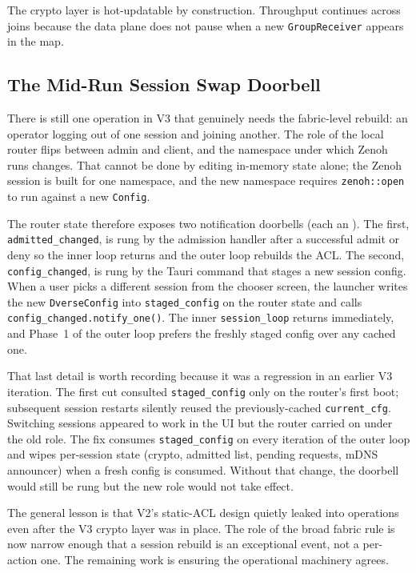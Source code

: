 \documentclass[11pt,a4paper]{article}
\begin{document}
The crypto layer is hot-updatable by construction. Throughput
continues across joins because the data plane does not pause when a
new \texttt{GroupReceiver} appears in the map.

\subsection{The Mid-Run Session Swap Doorbell}

There is still one operation in V3 that genuinely needs the
fabric-level rebuild: an operator logging out of one session and
joining another. The role of the local router flips between admin and
client, and the namespace under which Zenoh runs changes. That cannot
be done by editing in-memory state alone; the Zenoh session is built
for one namespace, and the new namespace requires
\texttt{zenoh::open} to run against a new \texttt{Config}.

The router state therefore exposes two notification doorbells
(each an ). The first,
\texttt{admitted\_changed}, is rung by the admission handler after a
successful admit or deny so the inner loop returns and the outer
loop rebuilds the ACL. The second, \texttt{config\_changed}, is rung
by the Tauri command that stages a new session config. When a user
picks a different session from the chooser screen, the launcher
writes the new \texttt{DverseConfig} into \texttt{staged\_config} on
the router state and calls \texttt{config\_changed.notify\_one()}.
The inner \texttt{session\_loop} returns immediately, and Phase~1 of
the outer loop prefers the freshly staged config over any cached one.

That last detail is worth recording because it was a regression in
an earlier V3 iteration. The first cut consulted
\texttt{staged\_config} only on the router's first boot; subsequent
session restarts silently reused the previously-cached
\texttt{current\_cfg}. Switching sessions appeared to work in the UI
but the router carried on under the old role. The fix consumes
\texttt{staged\_config} on every iteration of the outer loop and
wipes per-session state (crypto, admitted list, pending requests,
mDNS announcer) when a fresh config is consumed. Without that change,
the doorbell would still be rung but the new role would not take
effect.

The general lesson is that V2's static-ACL design quietly leaked into
operations even after the V3 crypto layer was in place. The role of
the broad fabric rule is now narrow enough that a session rebuild is
an exceptional event, not a per-action one. The remaining work is
ensuring the operational machinery agrees.
\end{document}
